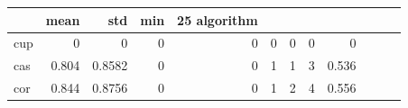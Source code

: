 \begin{tabular}{lrrrrrrrr}
\toprule
 & mean & std & min & 25%
algorithm &  &  &  &  &  &  &  &  \\
\midrule
cup & 0 & 0 & 0 & 0 & 0 & 0 & 0 & 0 \\
cas & 0.804 & 0.8582 & 0 & 0 & 1 & 1 & 3 & 0.536 \\
cor & 0.844 & 0.8756 & 0 & 0 & 1 & 2 & 4 & 0.556 \\
\bottomrule
\end{tabular}

